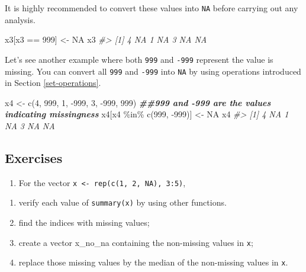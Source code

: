 \documentclass[
]{book}
\newenvironment{Shaded}{\begin{snugshade}}{\end{snugshade}}
\newcommand{\CommentTok}[1]{\textcolor[rgb]{0.56,0.35,0.01}{\textit{#1}}}
\newcommand{\ConstantTok}[1]{\textcolor[rgb]{0.00,0.00,0.00}{#1}}
\newcommand{\DecValTok}[1]{\textcolor[rgb]{0.00,0.00,0.81}{#1}}
\newcommand{\DocumentationTok}[1]{\textcolor[rgb]{0.56,0.35,0.01}{\textbf{\textit{#1}}}}
\newcommand{\FunctionTok}[1]{\textcolor[rgb]{0.00,0.00,0.00}{#1}}
\newcommand{\NormalTok}[1]{#1}
\newcommand{\OtherTok}[1]{\textcolor[rgb]{0.56,0.35,0.01}{#1}}
\newcommand{\SpecialCharTok}[1]{\textcolor[rgb]{0.00,0.00,0.00}{#1}}
\providecommand{\tightlist}{%
  \setlength{\itemsep}{0pt}\setlength{\parskip}{0pt}}
\begin{document}
It is highly recommended to convert these values into \texttt{NA} before carrying out any analysis.

\begin{Shaded}
\begin{Highlighting}[]
\NormalTok{x3[x3 }\SpecialCharTok{==} \DecValTok{999}\NormalTok{] }\OtherTok{\textless{}{-}} \ConstantTok{NA}
\NormalTok{x3}
\CommentTok{\#\textgreater{} [1]  4 NA  1 NA  3 NA NA}
\end{Highlighting}
\end{Shaded}

Let's see another example where both \texttt{999} and \texttt{-999} represent the value is missing. You can convert all \texttt{999} and \texttt{-999} into \texttt{NA} by using operations introduced in Section \ref{set-operations}.

\begin{Shaded}
\begin{Highlighting}[]
\NormalTok{x4 }\OtherTok{\textless{}{-}} \FunctionTok{c}\NormalTok{(}\DecValTok{4}\NormalTok{, }\DecValTok{999}\NormalTok{, }\DecValTok{1}\NormalTok{, }\SpecialCharTok{{-}}\DecValTok{999}\NormalTok{, }\DecValTok{3}\NormalTok{, }\SpecialCharTok{{-}}\DecValTok{999}\NormalTok{, }\DecValTok{999}\NormalTok{)}
\DocumentationTok{\#\#999 and {-}999 are the values indicating missingness}
\NormalTok{x4[x4 }\SpecialCharTok{\%in\%} \FunctionTok{c}\NormalTok{(}\DecValTok{999}\NormalTok{, }\SpecialCharTok{{-}}\DecValTok{999}\NormalTok{)] }\OtherTok{\textless{}{-}} \ConstantTok{NA}
\NormalTok{x4}
\CommentTok{\#\textgreater{} [1]  4 NA  1 NA  3 NA NA}
\end{Highlighting}
\end{Shaded}

\hypertarget{exercises-17}{%
\subsection{Exercises}\label{exercises-17}}

\begin{enumerate}
\def\labelenumi{\arabic{enumi}.}
\tightlist
\item
  For the vector \texttt{x\ \textless{}-\ rep(c(1,\ 2,\ NA),\ 3:5)},
\end{enumerate}

\begin{enumerate}
\def\labelenumi{\alph{enumi}.}
\tightlist
\item
  verify each value of \texttt{summary(x)} by using other functions.
\item
  find the indices with missing values;
\item
  create a vector x\_no\_na containing the non-missing values in \texttt{x};
\item
  replace those missing values by the median of the non-missing values in \texttt{x}.
\end{enumerate}
\end{document}
